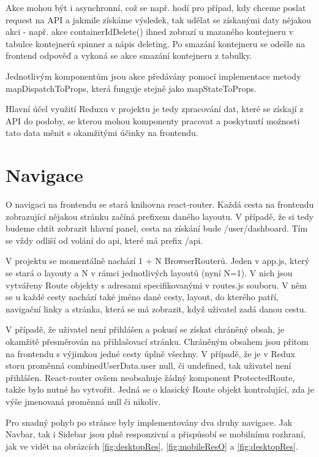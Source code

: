\documentclass[a4paper,oneside,12pt]{report}
\begin{document}
Akce mohou být i asynchronní, což se např. hodí pro případ, kdy chceme poslat request na API a jakmile získáme výsledek, tak udělat se získanými daty nějakou akci - např. akce containerIdDelete() ihned zobrazí u mazaného kontejneru v tabulce kontejnerů spinner a nápis deleting.
Po smazání kontejneru se odešle na frontend odpověď a vykoná se akce smazání kontejneru z tabulky.

Jednotlivým komponentům jsou akce předávány pomocí implementace metody mapDispatchToProps, která funguje stejně jako mapStateToProps.

Hlavní účel využití Reduxu v projektu je tedy zpracování dat, které se získají z API do podoby, se kterou mohou komponenty pracovat a poskytnutí možnosti tato data měnit s okamžitými účinky na frontendu.


\section{Navigace}

O navigaci na frontendu se stará knihovna react-router.
Každá cesta na frontendu zobrazující nějakou stránku začíná prefixem daného layoutu.
V případě, že si tedy budeme chtít zobrazit hlavní panel, cesta na získání bude /user/dashboard.
Tím se vždy odliší od volání do api, které má prefix /api.

V projektu se momentálně nachází 1 + N BrowserRouterů.
Jeden v app.js, který se stará o layouty a N v rámci jednotlivých layoutů (nyní N=1).
V nich jsou vytvářeny Route objekty s adresami specifikovanými v routes.js souboru.
V něm se u každé cesty nachází také jméno dané cesty, layout, do kterého patří, navigační linky a stránka, která se má zobrazit, když uživatel zadá danou cestu.

V případě, že uživatel není přihlášen a pokusí se získat chráněný obsah, je okamžitě přesměrován na přihlašovací stránku.
Chráněným obsahem jsou přitom na frontendu s výjimkou jedné cesty úplně všechny.
V případě, že je v Redux storu proměnná combinedUserData.user null, či undefined, tak uživatel není přihlášen.
React-router ovšem neobsahuje žádný komponent ProtectedRoute, takže bylo nutné ho vytvořit.
Jedná se o klasický Route objekt kontrolující, zda je výše jmenovaná proměnná null či nikoliv.

Pro snadný pohyb po stránce byly implementovány dva druhy navigace.
Jak Navbar, tak i Sidebar jsou plně responzivní a přispůsobí se mobilnímu rozhraní, jak ve vidět na obrázcích \ref{fig:desktopRes},  \ref{fig:mobileResO} a \ref{fig:desktopRes}.
\end{document}
